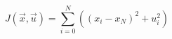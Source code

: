 \documentclass{article}
\begin{document}
\thispagestyle{empty}

$$
J(\vec{x},\vec{u}) = \sum\limits_{i=0}^N \left((x_i-x_N)^2 + u_i^2\right)
$$
\end{document}
